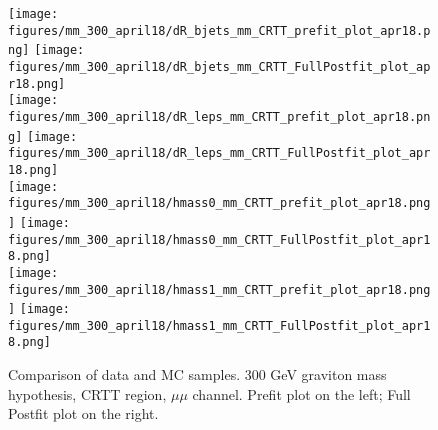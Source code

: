\begin{figure}[H]
\begin{center}
\texttt{[image: figures/mm\_300\_april18/dR\_bjets\_mm\_CRTT\_prefit\_plot\_apr18.png]}
\texttt{[image: figures/mm\_300\_april18/dR\_bjets\_mm\_CRTT\_FullPostfit\_plot\_apr18.png]}\\
\texttt{[image: figures/mm\_300\_april18/dR\_leps\_mm\_CRTT\_prefit\_plot\_apr18.png]}
\texttt{[image: figures/mm\_300\_april18/dR\_leps\_mm\_CRTT\_FullPostfit\_plot\_apr18.png]}\\
\texttt{[image: figures/mm\_300\_april18/hmass0\_mm\_CRTT\_prefit\_plot\_apr18.png]}
\texttt{[image: figures/mm\_300\_april18/hmass0\_mm\_CRTT\_FullPostfit\_plot\_apr18.png]}\\
\texttt{[image: figures/mm\_300\_april18/hmass1\_mm\_CRTT\_prefit\_plot\_apr18.png]}
\texttt{[image: figures/mm\_300\_april18/hmass1\_mm\_CRTT\_FullPostfit\_plot\_apr18.png]}\\
\caption[Data-MC comparison in CRTT.]{Comparison of data and MC samples. 300 GeV graviton mass hypothesis, CRTT region, $\mu\mu$ channel. Prefit plot on the left; Full Postfit plot on the right.}
\label{MCcomparisons_mm_low_CRTT}
\end{center}
\end{figure}

